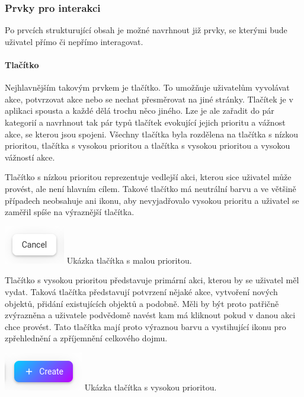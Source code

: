 \begin{itemize}
\begin{itemize}
		\subsubsection{Prvky pro interakci}

		Po prvcích strukturující obsah je možné navrhnout již prvky, se kterými bude uživatel přímo či nepřímo interagovat.

			\paragraph{Tlačítko}

			Nejhlavnějším takovým prvkem je tlačítko.
			To umožňuje uživatelům vyvolávat akce, potvrzovat akce nebo se nechat přesměrovat na jiné stránky.
			Tlačítek je v aplikaci spousta a každé dělá trochu něco jiného.
			Lze je ale zařadit do pár kategorií a navrhnout tak pár typů tlačítek evokující jejich prioritu a vážnost akce,
			se kterou jsou spojeni.
			Všechny tlačítka byla rozdělena na tlačítka s nízkou prioritou, tlačítka s vysokou prioritou a tlačítka s vysokou
			prioritou a vysokou vážností akce.

			Tlačítko s nízkou prioritou reprezentuje vedlejší akci, kterou sice uživatel může provést, ale není hlavním cílem.
			Takové tlačítko má neutrální barvu a ve většině případech neobsahuje ani ikonu, aby nevyjadřovalo vysokou prioritu
			a uživatel se zaměřil spíše na výraznější tlačítka.

			\includegraphics[width=0.24\linewidth]{obrazky/tlacitko_s_malou_prioritou}\hfill
			Ukázka tlačítka s malou prioritou. %

			Tlačítko s vysokou prioritou představuje primární akci, kterou by se uživatel měl vydat.
			Taková tlačítka představují potvrzení nějaké akce, vytvoření nových objektů, přidání existujících objektů a
			podobně.
			Měli by být proto patřičně zvýrazněna a uživatele podvědomě navést kam má kliknout pokud v danou akci chce
			provést.
			Tato tlačítka mají proto výraznou barvu a vystihující ikonu pro zpřehlednění a zpříjemnění celkového dojmu.

			\includegraphics[width=0.24\linewidth]{obrazky/tlacitko_s_velkou_prioritou}\hfill
			Ukázka tlačítka s vysokou prioritou. %


\end{itemize}
\end{itemize}
